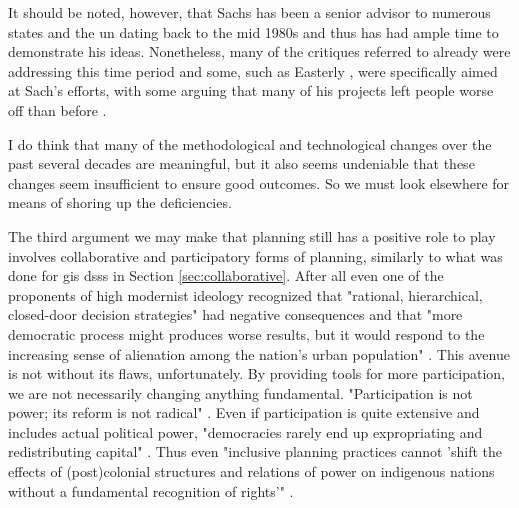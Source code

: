 It should be noted, however, that Sachs has been a senior advisor to numerous states and the \ac{un} dating back to the mid 1980s and thus has had ample time to demonstrate his ideas. Nonetheless, many of the critiques referred to already were addressing this time period and some, such as Easterly \cite{easterlyWhiteManBurden2007a}, were specifically aimed at Sach's efforts, with some arguing that many of his projects left people worse off than before \cite{munkIdealistJeffreySachs2014}.

I do think that many of the methodological and technological changes over the past several decades are meaningful, but it also seems undeniable that these changes seem insufficient to ensure good outcomes. So we must look elsewhere for means of shoring up the deficiencies.

The third argument we may make that planning still has a positive role to play involves collaborative and participatory forms of planning, similarly to what was done for \ac{gis} \acp{dss} in Section \ref{sec:collaborative}. After all even one of the proponents of high modernist ideology recognized that "rational, hierarchical, closed-door decision strategies" had negative consequences and that "more democratic process might produces worse results, but it would respond to the increasing sense of alienation among the nation's urban population" \cite{lightWarfareWelfareDefense2005}. This avenue is not without its flaws, unfortunately. By providing tools for more participation, we are not necessarily changing anything fundamental. "Participation is not power; its reform is not radical" \cite{marcuseThreeHistoricCurrents2016}. Even if participation is quite extensive and includes actual political power, "democracies rarely end up expropriating and redistributing capital" \cite{fainsteinSpatialJusticePlanning2016}. Thus even "inclusive planning practices cannot 'shift the effects of (post)colonial structures and relations of power on indigenous nations without a fundamental recognition of rights'" \cite{sandercockCommentaryIndigenousPlanning2004}.

